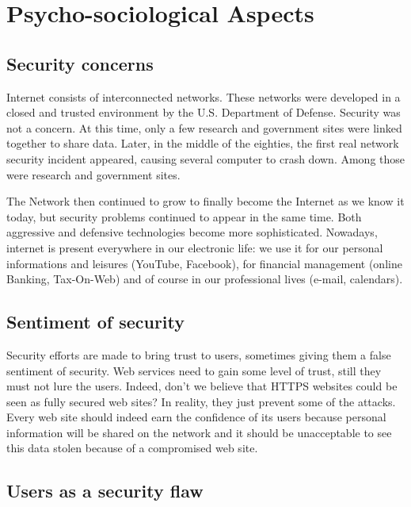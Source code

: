 
\section{Psycho-sociological Aspects}

\subsection{Security concerns}

Internet consists of interconnected networks. These networks were developed in
a closed and trusted environment by the U.S. Department of Defense.
Security was not a concern. At this time, only a few research and government
sites were linked together to share data. Later, in the middle of the
eighties, the first real network security incident appeared, causing several
computer to crash down. Among those were research and government sites.

The Network then continued to grow to finally become the Internet as we know
it today, but security problems continued to appear in the same time. Both
aggressive and defensive technologies become more sophisticated.
Nowadays, internet is present everywhere in our electronic life: we use it
for our personal informations and leisures (YouTube, Facebook), for financial
management (online Banking, Tax-On-Web) and of course in our professional
lives (e-mail, calendars).

\subsection{Sentiment of security}

Security efforts are made to bring trust to users, sometimes giving them a
false sentiment of security. Web services need to gain some level of trust, still they
must not lure the users. Indeed, don't we believe that HTTPS websites could be
seen as fully secured web sites? In reality, they just prevent some of the
attacks.
Every web site should indeed earn the confidence of its users because
personal information will be shared on the network and it should be
unacceptable to see this data stolen because of a compromised web site.

\subsection{Users as a security flaw}

